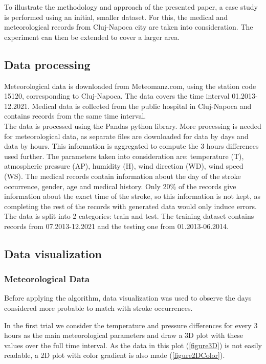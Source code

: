 \documentclass{article}
\begin{document}
To illustrate the methodology and approach of the presented paper, a case study is performed using an initial, smaller dataset. For this, the medical and meteorological records from Cluj-Napoca city are taken into consideration. The experiment can then be extended to cover a larger area.

\subsection{Data processing}

Meteorological data is downloaded from Meteomanz.com, using the station code 15120, corresponding to Cluj-Napoca. The data covers the time interval 01.2013-12.2021. Medical data is collected from the public hospital in Cluj-Napoca and contains records from the same time interval.
\\

The data is processed using the Pandas python library. More processing is needed for meteorological data, as separate files are downloaded for data by days and data by hours. This information is aggregated to compute the 3 hours differences used further. The parameters taken into consideration are: temperature (T), atmospheric pressure (AP), humidity (H), wind direction
(WD), wind speed (WS). The medical records contain information about the day of the stroke occurrence, gender, age and medical history. Only 20\% of the records give information about the exact time of the stroke, so this information is not kept, as completing the rest of the records with generated data would only induce errors. The data is split into 2 categories: train and test. The training dataset contains records from 07.2013-12.2021 and the testing one from 01.2013-06.2014. 

\subsection{Data visualization}

\subsubsection{Meteorological Data}

Before applying the algorithm, data visualization was used to observe the days considered more probable to match with stroke occurrences. 

In the first trial we consider the temperature and pressure differences for every 3 hours as the main meteorological parameters and draw a 3D plot with these values over the full time interval. As the data in this plot (\ref{figure3D}) is not easily readable, a 2D plot with color gradient is also made (\ref{figure2DColor}). 
\end{document}
